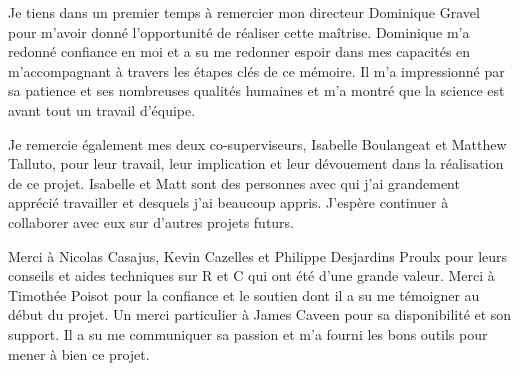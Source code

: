 

\Pagetitre
\cleardoublepage






\remerciements


Je tiens dans un premier temps à remercier mon directeur Dominique Gravel pour m'avoir donné
l'opportunité de réaliser cette maîtrise. Dominique m'a redonné confiance en moi et a su me redonner
espoir dans mes capacités en m'accompagnant à travers les étapes clés de ce mémoire. Il m'a impressionné par sa patience et ses nombreuses qualités humaines et m'a montré
que la science est avant tout un travail d'équipe.

Je remercie également mes deux co-superviseurs, Isabelle Boulangeat et Matthew Talluto, pour leur
travail, leur implication et leur dévouement dans la réalisation de ce projet. Isabelle et Matt sont
des personnes avec qui j'ai grandement apprécié travailler et desquels j'ai beaucoup appris. J'espère continuer à collaborer avec eux sur d'autres projets futurs.

Merci à Nicolas Casajus, Kevin Cazelles et Philippe Desjardins Proulx pour leurs conseils et aides
techniques sur R et C qui ont été d'une grande valeur. Merci à Timothée Poisot pour la confiance et
le soutien dont il a su me témoigner au début du projet. Un merci particulier à James Caveen pour sa
disponibilité et son support. Il a su me communiquer sa passion et m'a fourni les bons outils pour
mener à bien ce projet.

